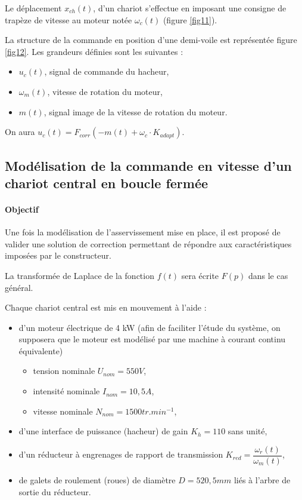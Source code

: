 \newpage

Le déplacement $x_{ch}(t)$, d'un chariot s'effectue en imposant une consigne de trapèze de vitesse au moteur notée $\omega_c(t)$ (figure \ref{fig11}).


La structure de la commande en position d'une demi-voile est représentée figure \ref{fig12}. Les grandeurs définies sont les suivantes :
\begin{itemize}
 \item $u_c(t)$, signal de commande du hacheur,
 \item $\omega_m(t)$, vitesse de rotation du moteur,
 \item $m(t)$, signal image de la vitesse de rotation du moteur.
\end{itemize}

On aura $u_{c}(t)=F_{corr}\left(-m(t)+\omega_c\cdot K_{adapt}\right)$.


\subsection{Modélisation de la commande en vitesse d'un chariot central en boucle fermée}

\paragraph{Objectif} Une fois la modélisation de l'asservissement mise en place, il est proposé de valider une solution de correction permettant de répondre aux caractéristiques imposées par le constructeur.

La transformée de Laplace de la fonction $f(t)$ sera écrite $F(p)$ dans le cas général.

\newpage

Chaque chariot central est mis en mouvement à l'aide :
\begin{itemize}
 \item d'un moteur électrique de 4 kW (afin de faciliter l'étude du système, on supposera que le moteur est modélisé par une machine à courant continu équivalente)
 \begin{itemize}
  \item tension nominale $U_{nom}=550 V$,
  \item intensité nominale $I_{nom}=10,5 A$,
  \item vitesse nominale $N_{nom}=1500 tr.min^{-1}$,
 \end{itemize}
 \item d'une interface de puissance (hacheur) de gain $K_h=110$ sans unité,
 \item d'un réducteur à engrenages de rapport de transmission $K_{red}=\dfrac{\omega_r(t)}{\omega_m(t)}$,
 \item de galets de roulement (roues) de diamètre $D=520,5mm$ liés à l'arbre de sortie du réducteur.
\end{itemize}


